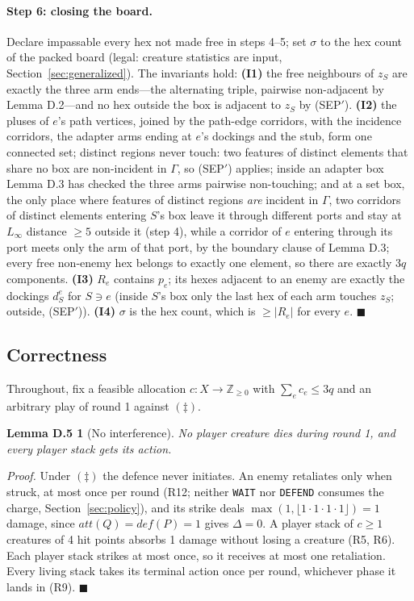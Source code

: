 \documentclass[11pt,a4paper]{article}
\theoremstyle{plain}
\newtheorem*{lemnoint}{Lemma D.5}
\theoremstyle{definition}
\theoremstyle{plain}
\theoremstyle{definition}
\theoremstyle{remark}
\newcommand{\qedbox}{\hfill$\blacksquare$}
\begin{document}
\paragraph{Step 6: closing the board.} Declare impassable every hex not made free in steps 4--5;
set $\sigma$ to the hex count of the packed board (legal: creature statistics are input,
Section~\ref{sec:generalized}). The invariants hold: \textbf{(I1)} the free neighbours of $z_S$
are exactly the three arm ends---the alternating triple, pairwise non-adjacent by
Lemma D.2---and no hex outside the box is adjacent to $z_S$ by (SEP$'$). \textbf{(I2)} the pluses
of $e$'s path vertices, joined by the path-edge corridors, with the incidence corridors, the
adapter arms ending at $e$'s dockings and the stub, form one connected set; distinct regions never
touch: two features of distinct elements that share no box are non-incident in $\Gamma$, so
(SEP$'$) applies; inside an adapter box Lemma D.3 has checked the three arms pairwise
non-touching; and at a set box, the only place where features of distinct regions \emph{are}
incident in $\Gamma$, two corridors of distinct elements entering $S$'s box leave it through
different ports and stay at $L_\infty$ distance $\ge 5$ outside it (step 4), while a corridor
of $e$ entering through its port meets only the arm of that port, by the boundary clause of
Lemma D.3; every free non-enemy hex belongs
to exactly one element, so there are exactly $3q$ components. \textbf{(I3)} $R_e$ contains $p_e$;
its hexes adjacent to an enemy are exactly the dockings $d_S^e$ for $S\ni e$ (inside $S$'s box
only the last hex of each arm touches $z_S$; outside, (SEP$'$)).
\textbf{(I4)} $\sigma$ is the hex count, which is $\ge|R_e|$ for every $e$. \qedbox

\subsection{Correctness}

Throughout, fix a feasible allocation $c:X\to\mathbb{Z}_{\ge 0}$ with $\sum_e c_e\le 3q$ and an
arbitrary play of round 1 against $(\ddagger)$.

\begin{lemnoint}[No interference]
No player creature dies during round 1, and every player stack gets its action.
\end{lemnoint}

\noindent\emph{Proof.} Under $(\ddagger)$ the defence never initiates. An enemy retaliates only
when struck, at most once per round (R12; neither \texttt{WAIT} nor \texttt{DEFEND} consumes the
charge, Section~\ref{sec:policy}), and its strike deals $\max(1,\lfloor 1\cdot 1\cdot
1\cdot 1\rfloor)=1$ damage, since $\mathit{att}(Q)=\mathit{def}(P)=1$ gives $\Delta=0$. A player stack of
$c\ge 1$ creatures of 4 hit points absorbs 1 damage without losing a creature (R5, R6). Each
player stack strikes at most once, so it receives at most one retaliation. Every living stack
takes its terminal action once per round, whichever phase it lands in (R9). \qedbox
\end{document}
